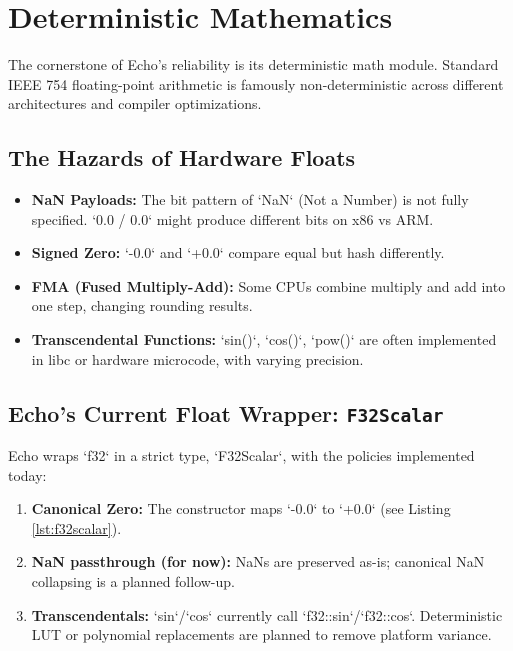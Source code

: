 \chapter{Deterministic Mathematics}

The cornerstone of Echo's reliability is its deterministic math module. Standard IEEE 754 floating-point arithmetic is famously non-deterministic across different architectures and compiler optimizations.

\section{The Hazards of Hardware Floats}

\begin{itemize}
    \item \textbf{NaN Payloads:} The bit pattern of `NaN` (Not a Number) is not fully specified. `0.0 / 0.0` might produce different bits on x86 vs ARM.
    \item \textbf{Signed Zero:} `-0.0` and `+0.0` compare equal but hash differently.
    \item \textbf{FMA (Fused Multiply-Add):} Some CPUs combine multiply and add into one step, changing rounding results.
    \item \textbf{Transcendental Functions:} `sin()`, `cos()`, `pow()` are often implemented in libc or hardware microcode, with varying precision.
\end{itemize}

\section{Echo's Current Float Wrapper: \texttt{F32Scalar}}

Echo wraps `f32` in a strict type, `F32Scalar`, with the policies implemented today:

\begin{enumerate}
    \item \textbf{Canonical Zero:} The constructor maps `-0.0` to `+0.0` (see Listing \ref{lst:f32scalar}).
    \item \textbf{NaN passthrough (for now):} NaNs are preserved as-is; canonical NaN collapsing is a planned follow-up.
    \item \textbf{Transcendentals:} `sin`/`cos` currently call `f32::sin`/`f32::cos`. Deterministic LUT or polynomial replacements are planned to remove platform variance.
\end{enumerate}

